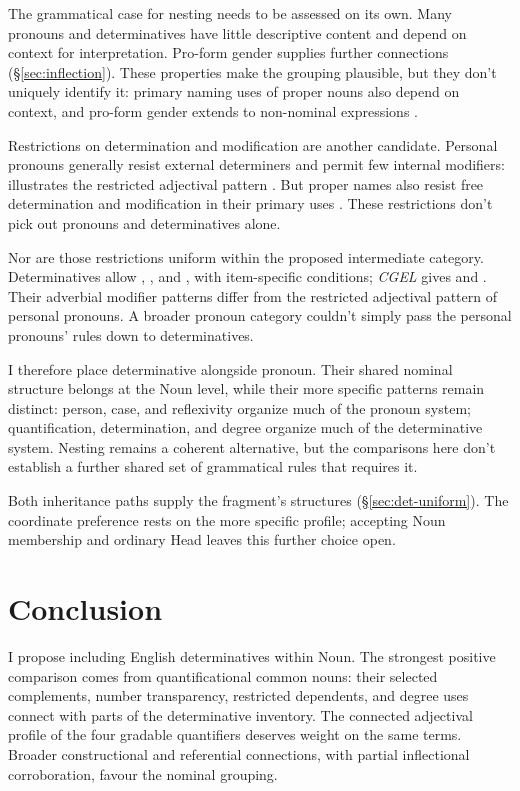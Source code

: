 \documentclass[12pt]{article}
\begin{document}
The grammatical case for nesting needs to be assessed on its own. Many pronouns and determinatives have little descriptive content and depend on context for interpretation. Pro-form gender supplies further connections (§\ref{sec:inflection}). These properties make the grouping plausible, but they don't uniquely identify it: primary naming uses of proper nouns also depend on context, and pro-form gender extends to non-nominal expressions \citep{reynolds2025proformgender}.

Restrictions on determination and modification are another candidate. Personal pronouns generally resist external determiners and permit few internal modifiers:  illustrates the restricted adjectival pattern \citep[429--430]{huddleston2002}. But proper names also resist free determination and modification in their primary uses \citep[517, 519--520]{huddleston2002}. These restrictions don't pick out pronouns and determinatives alone.

Nor are those restrictions uniform within the proposed intermediate category. Determinatives allow , , and , with item-specific conditions; \textit{CGEL} gives  and  \citep[415--416]{huddleston2002}. Their adverbial modifier patterns differ from the restricted adjectival pattern of personal pronouns. A broader pronoun category couldn't simply pass the personal pronouns' rules down to determinatives.

I therefore place determinative alongside pronoun. Their shared nominal structure belongs at the Noun level, while their more specific patterns remain distinct: person, case, and reflexivity organize much of the pronoun system; quantification, determination, and degree organize much of the determinative system. Nesting remains a coherent alternative, but the comparisons here don't establish a further shared set of grammatical rules that requires it.

Both inheritance paths supply the fragment's structures (§\ref{sec:det-uniform}). The coordinate preference rests on the more specific profile; accepting Noun membership and ordinary Head leaves this further choice open.

\section{Conclusion}\label{sec:conclusion}

I propose including English determinatives within Noun. The strongest positive comparison comes from quantificational common nouns: their selected complements, number transparency, restricted dependents, and degree uses connect with parts of the determinative inventory. The connected adjectival profile of the four gradable quantifiers deserves weight on the same terms. Broader constructional and referential connections, with partial inflectional corroboration, favour the nominal grouping.
\end{document}
